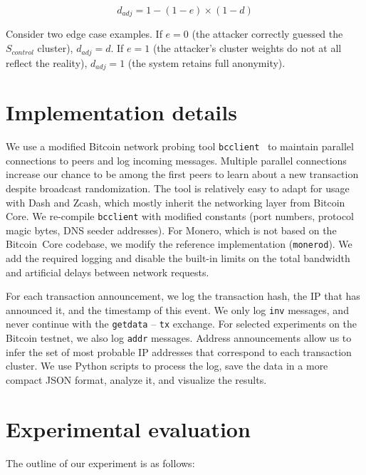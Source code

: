 \[
d_{adj} = 1 - (1 - e) \times (1 - d)
\]

Consider two edge case examples.
If $e = 0$ (the attacker correctly guessed the~$S_{control}$ cluster), $d_{adj} = d$.
If $e = 1$ (the attacker's cluster weights do not at all reflect the reality), $d_{adj} = 1$ (the system retains full anonymity).


\section{Implementation details}

We use a modified Bitcoin network probing tool \texttt{bcclient}~\cite{Pustogarov2017} to maintain parallel connections to peers and log incoming messages.
Multiple parallel connections increase our chance to be among the first peers to learn about a new transaction despite broadcast randomization.
The tool is relatively easy to adapt for usage with Dash and Zcash, which mostly inherit the networking layer from Bitcoin Core.
We re-compile \texttt{bcclient} with modified constants (port numbers, protocol magic bytes, DNS seeder addresses).
For Monero, which is not based on the Bitcoin~Core codebase, we modify the reference implementation (\texttt{monerod}).
We add the required logging and disable the built-in limits on the total bandwidth and artificial delays between network requests.

For each transaction announcement, we log the transaction hash, the IP that has announced it, and the timestamp of this event.
We only log \texttt{inv} messages, and never continue with the \texttt{getdata} -- \texttt{tx} exchange.
For selected experiments on the Bitcoin testnet, we also log \texttt{addr} messages.
Address announcements allow us to infer the set of most probable IP addresses that correspond to each transaction cluster.
We use Python scripts to process the log, save the data in a more compact JSON format, analyze it, and visualize the results.


\section{Experimental evaluation}

The outline of our experiment is as follows:

